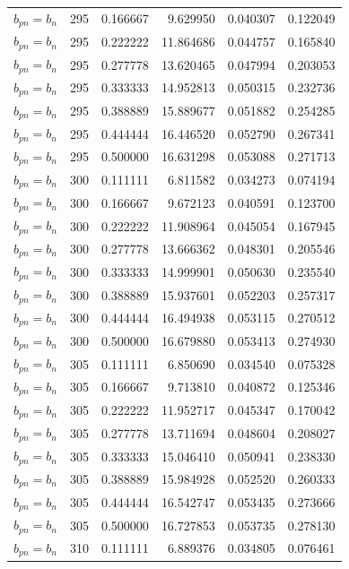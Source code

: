 \begin{longtable}{l r r r r r}
$b_{pn} = b_n$ & 295 & 0.166667 & 9.629950 & 0.040307 & 0.122049 \\
$b_{pn} = b_n$ & 295 & 0.222222 & 11.864686 & 0.044757 & 0.165840 \\
$b_{pn} = b_n$ & 295 & 0.277778 & 13.620465 & 0.047994 & 0.203053 \\
$b_{pn} = b_n$ & 295 & 0.333333 & 14.952813 & 0.050315 & 0.232736 \\
$b_{pn} = b_n$ & 295 & 0.388889 & 15.889677 & 0.051882 & 0.254285 \\
$b_{pn} = b_n$ & 295 & 0.444444 & 16.446520 & 0.052790 & 0.267341 \\
$b_{pn} = b_n$ & 295 & 0.500000 & 16.631298 & 0.053088 & 0.271713 \\
$b_{pn} = b_n$ & 300 & 0.111111 & 6.811582 & 0.034273 & 0.074194 \\
$b_{pn} = b_n$ & 300 & 0.166667 & 9.672123 & 0.040591 & 0.123700 \\
$b_{pn} = b_n$ & 300 & 0.222222 & 11.908964 & 0.045054 & 0.167945 \\
$b_{pn} = b_n$ & 300 & 0.277778 & 13.666362 & 0.048301 & 0.205546 \\
$b_{pn} = b_n$ & 300 & 0.333333 & 14.999901 & 0.050630 & 0.235540 \\
$b_{pn} = b_n$ & 300 & 0.388889 & 15.937601 & 0.052203 & 0.257317 \\
$b_{pn} = b_n$ & 300 & 0.444444 & 16.494938 & 0.053115 & 0.270512 \\
$b_{pn} = b_n$ & 300 & 0.500000 & 16.679880 & 0.053413 & 0.274930 \\
$b_{pn} = b_n$ & 305 & 0.111111 & 6.850690 & 0.034540 & 0.075328 \\
$b_{pn} = b_n$ & 305 & 0.166667 & 9.713810 & 0.040872 & 0.125346 \\
$b_{pn} = b_n$ & 305 & 0.222222 & 11.952717 & 0.045347 & 0.170042 \\
$b_{pn} = b_n$ & 305 & 0.277778 & 13.711694 & 0.048604 & 0.208027 \\
$b_{pn} = b_n$ & 305 & 0.333333 & 15.046410 & 0.050941 & 0.238330 \\
$b_{pn} = b_n$ & 305 & 0.388889 & 15.984928 & 0.052520 & 0.260333 \\
$b_{pn} = b_n$ & 305 & 0.444444 & 16.542747 & 0.053435 & 0.273666 \\
$b_{pn} = b_n$ & 305 & 0.500000 & 16.727853 & 0.053735 & 0.278130 \\
$b_{pn} = b_n$ & 310 & 0.111111 & 6.889376 & 0.034805 & 0.076461 \\

\end{longtable}
